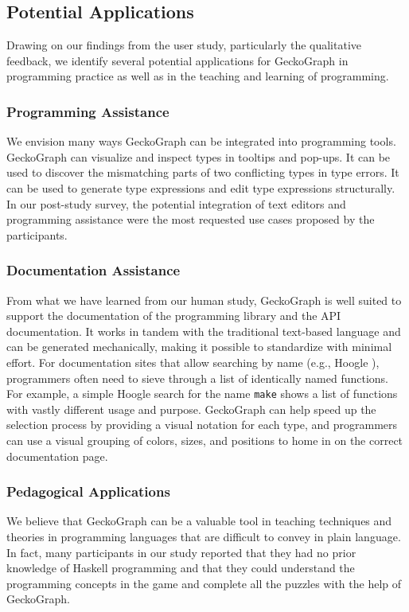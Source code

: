\subsection{Potential Applications}

Drawing on our findings from the user study, particularly the qualitative feedback, we identify several potential applications for GeckoGraph in programming practice as well as in the teaching and learning of programming.

\subsubsection{Programming Assistance}
We envision many ways GeckoGraph can be integrated into programming tools. GeckoGraph can visualize and inspect types in tooltips and pop-ups. It can be used to discover the mismatching parts of two conflicting types in type errors. It can be used to generate type expressions and edit type expressions structurally. In our post-study survey, the potential integration of text editors and programming assistance were the most requested use cases proposed by the participants. 

\subsubsection{Documentation Assistance}
From what we have learned from our human study, GeckoGraph is well suited to support the documentation of the programming library and the API documentation. It works in tandem with the traditional text-based language and can be generated mechanically, making it possible to standardize with minimal effort. For documentation sites that allow searching by name (e.g., Hoogle \cite{Mitchell_undated-fb}), programmers often need to sieve through a list of identically named functions. For example, a simple Hoogle search for the name \texttt{make} shows a list of functions with vastly different usage and purpose. GeckoGraph can help speed up the selection process by providing a visual notation for each type, and programmers can use a visual grouping of colors, sizes, and positions to home in on the correct documentation page.



\subsubsection{Pedagogical Applications}
We believe that GeckoGraph can be a valuable tool in teaching techniques and theories in programming languages that are difficult to convey in plain language. In fact, many participants in our study reported that they had no prior knowledge of Haskell programming and that they could understand the programming concepts in the game and complete all the puzzles with the help of GeckoGraph.

